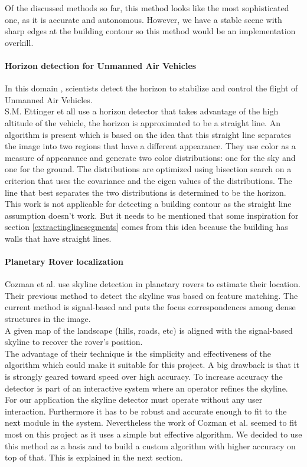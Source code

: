 Of the discussed methods so far, this method looks like the most sophisticated one, as
it is accurate and autonomous. However, we have a stable scene with sharp edges
at the building contour so this method would be an implementation overkill.  


\paragraph{Horizon detection for Unmanned Air Vehicles}
In this domain \cite{Guidedflight}, scientists detect the horizon to stabilize and control the
flight of Unmanned Air Vehicles.\\  
S.M. Ettinger et all \cite{Guidedflight} use a horizon detector that takes
advantage of the high altitude of the vehicle, the horizon is approximated to be
a straight line.  An algorithm is present which is based on the idea that this
straight line separates the image into two regions that have a different
appearance. They use color as a measure of appearance and generate two color
distributions: one for the sky and one for the ground. The distributions are
optimized using bisection search on a criterion that uses the covariance and the
eigen values of the distributions. The line that best separates the two
distributions is determined to be the horizon.\\

This work is not applicable for detecting a building contour as the
straight line assumption doesn't work. But it needs to be mentioned that some
inspiration for section \ref{extractinglinesegments} %
comes from this idea because the building has walls that have straight lines.

\paragraph{Planetary Rover localization}
Cozman et al. \cite{Rover} use skyline detection in planetary rovers to estimate their location.  Their
previous method to detect the skyline was based on feature matching. The current
method is signal-based and puts the focus correspondences among dense structures
in the image.\\
A given map of the landscape (hills, roads, etc) is aligned with the
signal-based skyline to recover the rover's position.\\

The advantage of their technique is the simplicity and effectiveness of the
algorithm which could make it suitable for this project.  A big drawback is that
it is strongly geared toward speed over high accuracy. To increase accuracy the
detector is part of an interactive system where an operator refines the skyline.
For our application the skyline detector must operate without any user
interaction. Furthermore it has to be robust and accurate enough to fit to the next module
in the system.  Nevertheless the work of Cozman et al. \cite{Rover} seemed to fit most on
this project as it uses a simple but effective algorithm.  We decided to use
this method as a basis and to build a custom algorithm with higher accuracy on
top of that. This is explained in the next section.


